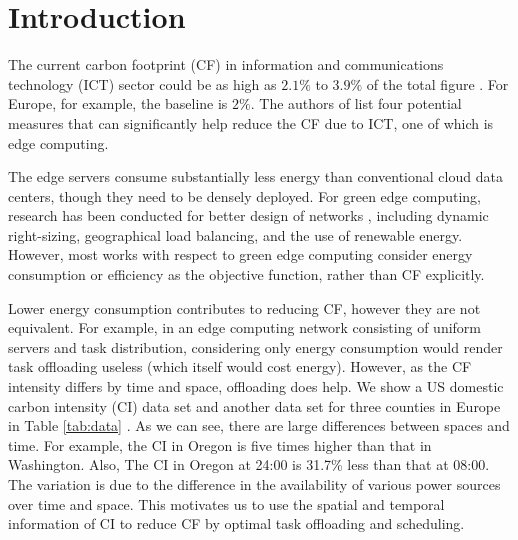 \documentclass[conference, 10pt, ﬁnal, letterpaper, twocolumn]{IEEEtran}
\begin{document}

\section{Introduction}
The current carbon footprint (CF) in information and communications technology (ICT) sector could be as high as $2.1\%$ to $3.9\%$ of the total figure \cite{Freitag2021Theclimate}. For Europe, for example, the baseline is $2\%$\cite{EuropeanCommission}. The authors of \cite{perrons2021digital} list four potential measures that can significantly help reduce the CF due to ICT, one of which is edge computing. 

The edge servers consume substantially less energy than conventional cloud data centers, though they need to be densely deployed. For green edge computing, research has been conducted for better design of networks \cite{mao2017survey}, including dynamic right-sizing, geographical load balancing, and the use of renewable energy. However, most works with respect to green edge computing consider energy consumption or efficiency as the objective function, rather than CF explicitly. 

Lower energy consumption contributes to reducing CF, however they are not equivalent. For example, in an edge computing network consisting of uniform servers and task distribution, considering only energy consumption would render task offloading useless (which itself would cost energy). However, as the CF intensity differs by time and space, offloading does help. We show a US domestic carbon intensity (CI) data set and another data set for three counties in Europe in Table \ref{tab:data} \cite{ElectricityMaps}. As we can see, there are large differences between spaces and time. For example, the CI in Oregon is five times higher than that in Washington. Also, The CI in Oregon at 24:00 is 31.7\% less than that at 08:00. The variation is due to the difference in the availability of various power sources over time and space. This motivates us to use the spatial and temporal information of CI to reduce CF by optimal task offloading and scheduling.  
\end{document}
